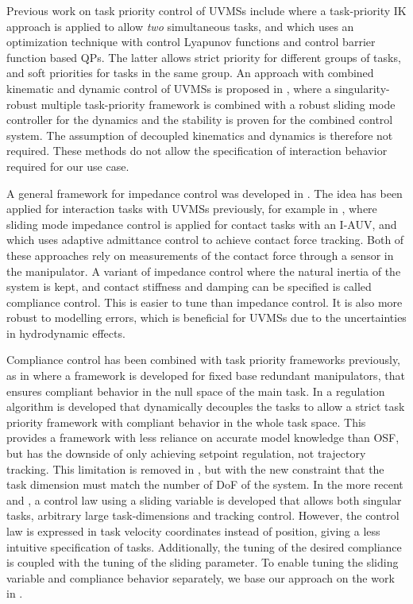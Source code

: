 \documentclass[../main.tex]{subfiles}
\begin{document}
Previous work on task priority control of UVMSs include \cite{Antonelli1998} where a task-priority IK approach is applied to allow \emph{two} simultaneous tasks, and \cite{Basso2020} which uses an optimization technique with control Lyapunov functions and control barrier function based QPs. The latter allows strict priority for different groups of tasks, and soft priorities for tasks in the same group. An approach with combined kinematic and dynamic control of UVMSs is proposed in \cite{Borlaug2020a}, where a singularity-robust multiple task-priority framework is combined with a robust sliding mode controller for the dynamics and the stability is proven for the combined control system. The assumption of decoupled kinematics and dynamics is therefore not required. These methods do not allow the specification of interaction behavior required for our use case.

A general framework for impedance control was developed in \cite{Hogan1984}. The idea has been applied for interaction tasks with UVMSs previously, for example in \cite{Dai2020}, where sliding mode impedance control is applied for contact tasks with an I-AUV, and \cite{cieslak2018} which uses adaptive admittance control to achieve contact force tracking. Both of these approaches rely on measurements of the contact force through a sensor in the manipulator. A variant of impedance control where the natural inertia of the system is kept, and contact stiffness and damping can be specified is called compliance control\cite{dietrich2020}. This is easier to tune than impedance control. It is also more robust to modelling errors, which is beneficial for UVMSs due to the uncertainties in hydrodynamic effects.

Compliance control has been combined with task priority frameworks previously, as in \cite{Sadeghian2014} where a framework is developed for fixed base redundant manipulators, that ensures compliant behavior in the null space of the main task. In \cite{Ott2015} a regulation algorithm is developed that dynamically decouples the tasks to allow a strict task priority framework with compliant behavior in the whole task space. This provides a framework with less reliance on accurate model knowledge than OSF, but has the downside of only achieving setpoint regulation, not trajectory tracking. This limitation is removed in \cite{dietrich2020}, but with the new constraint that the task dimension must match the number of DoF of the system. In the more recent \cite{Garofalo2020} and \cite{Garofalo2021}, a control law using a sliding variable is developed that allows both singular tasks, arbitrary large task-dimensions and tracking control. However, the control law is expressed in task velocity coordinates instead of position, giving a less intuitive specification of tasks. Additionally, the tuning of the desired compliance is coupled with the tuning of the sliding parameter. To enable tuning the sliding variable and compliance behavior separately, we base our approach on the work in \cite{dietrich2020}.
\end{document}
